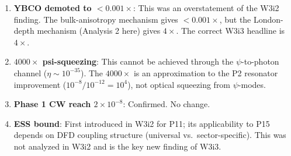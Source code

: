 \documentclass[11pt]{article}
\newcommand{\ee}[1]{\times 10^{#1}}
\begin{document}
\begin{enumerate}
\item \textbf{YBCO demoted to $< 0.001\times$}: This was an overstatement of the
W3i2 finding. The bulk-anisotropy mechanism gives $< 0.001\times$, but the
London-depth mechanism (Analysis 2 here) gives $4\times$. The correct
W3i3 headline is $4\times$.

\item \textbf{$4000\times$ psi-squeezing}: This cannot be achieved through the
$\psi$-to-photon channel ($\eta \sim 10^{-35}$). The $4000\times$ is an
approximation to the P2 resonator improvement ($10^{-8}/10^{-12} = 10^4$),
not optical squeezing from $\psi$-modes.

\item \textbf{Phase 1 CW reach $2\ee{-8}$}: Confirmed. No change.

\item \textbf{ESS bound}: First introduced in W3i2 for P11; its applicability
to P15 depends on DFD coupling structure (universal vs.\ sector-specific).
This was not analyzed in W3i2 and is the key new finding of W3i3.
\end{enumerate}
\end{document}
